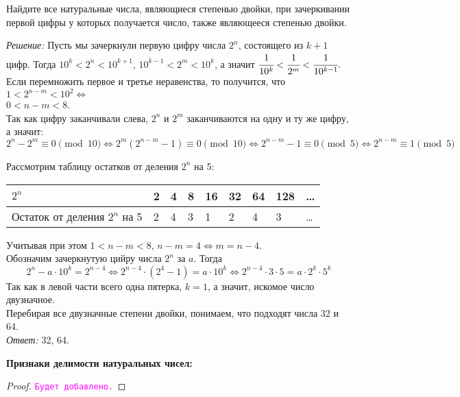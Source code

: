 \documentclass[11pt]{article}
\begin{document}
\begin{example}
	Найдите все натуральные числа, являющиеся степенью двойки, при зачеркивании первой цифры у которых получается число, также являющееся степенью двойки.
\end{example}
\textit{Решение:}
Пусть мы зачеркнули первую цифру числа $2^n$, состоящего из $k + 1$ цифр. Тогда  $10^k < 2^n < 10^{k + 1}$, $10^{k - 1} < 2^m < 10^k$, а значит $\cfrac{1}{10^k} < \cfrac{1}{2^m} < \cfrac{1}{10^{k - 1}}.$\\
Если перемножить первое и третье неравенства, то получится, что $1 < 2^{n - m} < 10^{2} \Longleftrightarrow$\\ $0 < n - m < 8$.\\
Так как цифру заканчивали слева, $2^n$ и $2^m$ заканчиваются на одну и ту же цифру, а значит:\\
\[2^n - 2^m \equiv 0 \pmod{10} \Leftrightarrow 2^m(2^{n - m} - 1) \equiv 0 \pmod{10} \Leftrightarrow
2^{n - m} - 1 \equiv 0 \pmod 5 \Leftrightarrow 2^{n - m} \equiv 1 \pmod 5 \]

Рассмотрим таблицу остатков от деления $2^n$ на 5:

\begin{center}
\begin{tabular}{ | l | l | l | l | l | l | l | l | l |}
\hline
$2^n$ & 2 & 4 & 8 & 16 & 32 & 64 & 128 & \ldots \\ \hline
Остаток от деления $2^n$ на 5   & 2 & 4 & 3 & 1 & 2 & 4 & 3 & \ldots\\\hline
\end{tabular}
\end{center}

Учитывая при этом $1 < n - m < 8 $, $n - m = 4 \Leftrightarrow m = n - 4$.\\
Обозначим зачеркнутую цийру числа $2^n$ за $a$. Тогда
\[2^n - a \cdot 10^k = 2^{n - 4} \Leftrightarrow
2^{n - 4} \cdot (2^{4} - 1) = a \cdot 10^k \Leftrightarrow
2^{n - 4} \cdot 3 \cdot 5 = a \cdot 2^k \cdot 5^k \]
Так как в левой части всего одна пятерка, $k = 1$, а значит, искомое число двузначное.\\
Перебирая все двузначные степени двойки, понимаем, что подходят числа 32 и 64.\\
\textit{Ответ:} 32, 64.

\textbf{Признаки делимости натуральных чисел:}

\begin{proof}
    \textcolor{magenta}{\texttt{Будет добавлено.}}
\end{proof}
\end{document}
